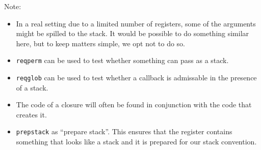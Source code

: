 \documentclass[a4paper]{article}
\begin{document}
              Note:
              \begin{itemize}
              \item In a real setting due to a limited number of registers, some of the arguments might be spilled to the stack. It would be possible to do something similar here, but to keep
                matters simple, we opt not to do so.
              \item \texttt{reqperm} can be used to test whether something can pass as a stack.
              \item \texttt{reqglob} can be used to test whether a callback is admissable in the presence of a stack.
              \item The code of a closure will often be found in conjunction with the code that creates it.
              \item \texttt{prepstack} as ``prepare stack''. This ensures that the register contains something that looks like a stack and it is prepared for our stack convention.
              \end{itemize}
\end{document}
